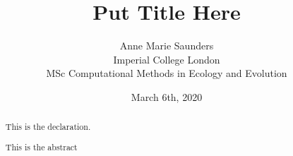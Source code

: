 \documentclass[11pt, a4paper]{report}
\title{Put Title Here}
\author{Anne Marie Saunders\\
Imperial College London\\
MSc Computational Methods in Ecology and Evolution\\}
\date{March 6th, 2020\\ 
}
\begin{document}

\begin{titlepage}
	\maketitle
\end{titlepage}


\renewcommand{\abstractname}{Declaration}
\begin{abstract}
This is the declaration.
\end{abstract}

\renewcommand{\abstractname}{Abstract}
\begin{abstract}
This is the abstract
\end{abstract}

\clearpage\tableofcontents %
\thispagestyle{empty}

\pagebreak %

\begin{linenumbers}

\pagebreak


\pagebreak


\pagebreak


\end{linenumbers}




%
\end{document}
